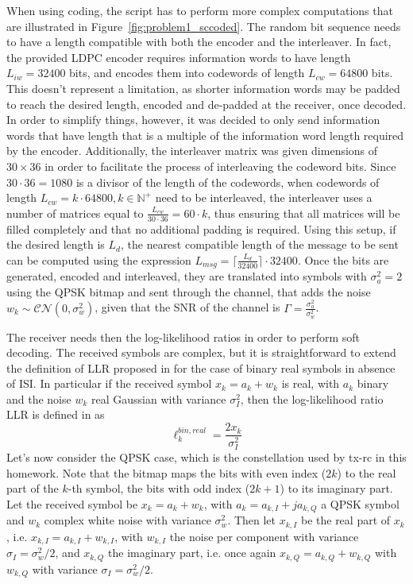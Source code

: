 \documentclass[10pt]{article}
\begin{document}
When using coding, the script has to perform more complex computations that are illustrated in Figure~\ref{fig:problem1_sccoded}. The random bit sequence needs to have a length compatible with both the encoder and the interleaver. In fact, the provided LDPC encoder requires information words to have length $L_{iw} = 32400$ bits, and encodes them into codewords of length $L_{cw} = 64800$ bits. This doesn't represent a limitation, as shorter information words may be padded to reach the desired length, encoded and de-padded at the receiver, once decoded. In order to simplify things, however, it was decided to only send information words that have length that is a multiple of the information word length required by the encoder. Additionally, the interleaver matrix was given dimensions of $30 \times 36$ in order to facilitate the process of interleaving the codeword bits. Since $30 \cdot 36 = 1080$ is a divisor of the length of the codewords, when codewords of length $L_{cw} = k \cdot 64800, k \in \mathbb{N^{+}}$ need to be interleaved, the interleaver uses a number of matrices equal to $\frac{L_{cw}}{30\cdot36} = 60 \cdot k$, thus ensuring that all matrices will be filled completely and that no additional padding is required. Using this setup, if the desired length is $L_d$, the nearest compatible length of the message to be sent can be computed using the expression $L_{msg} = \lceil \frac{L_{d}}{32400} \rceil \cdot 32400$. 
Once the bits are generated, encoded and interleaved, they are translated into symbols with $\sigma_a^2 = 2$ using the QPSK bitmap and sent through the channel, that adds the noise $w_k \sim \mathcal{CN}(0, \sigma_w^2)$, given that the SNR of the channel is $\Gamma = \frac{\sigma_a^2}{\sigma_w^2}$. 

The receiver needs then the log-likelihood ratios in order to perform soft decoding. The received symbols are complex, but it is straightforward to extend the definition of LLR proposed in \cite{bc} for the case of binary real symbols in absence of ISI. In particular if the received symbol $x_k = a_k + w_k$ is real, with $a_k$ binary and the noise $w_k$ real Gaussian with variance $\sigma_I^2$, then the log-likelihood ratio LLR is defined in \cite{bc} as 
\begin{equation}
	\ell_k^{bin, real} = \frac{2 x_k}{\sigma_I^2}
\end{equation}
Let's now consider the QPSK case, which is the constellation used by tx-rc in this homework. Note that the bitmap maps the bits with even index ($2k$) to the real part of the $k$-th symbol, the bits with odd index ($2k + 1$) to its imaginary part. Let the received symbol be $x_k = a_k + w_k$, with $a_k = a_{k, I} + j a_{k, Q}$ a QPSK symbol and $w_k$ complex white noise with variance $\sigma_w^2$. Then let $x_{k,I}$ be the real part of $x_k$, i.e. $x_{k,I} = a_{k, I} + w_{k, I}$, with $w_{k,I}$ the noise per component with variance $\sigma_I = \sigma_w^2/2$, and $x_{k, Q}$ the imaginary part, i.e. once again $x_{k,Q} = a_{k, Q} + w_{k, Q}$ with $w_{k, Q}$ with variance $\sigma_I = \sigma_w^2/2$. 
\end{document}
